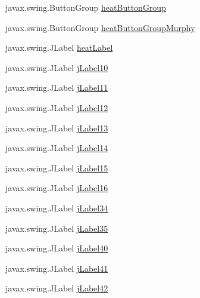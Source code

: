 \begin{DoxyCompactItemize}
\item 
javax.\+swing.\+Button\+Group \hyperlink{classTrainControllerComps_1_1TCTestConsole_a652801186a60bbfa55e7a7da6e356eac}{heat\+Button\+Group}
\item 
javax.\+swing.\+Button\+Group \hyperlink{classTrainControllerComps_1_1TCTestConsole_a1e24f88e3c130a9197c58398af71062b}{heat\+Button\+Group\+Murphy}
\item 
javax.\+swing.\+J\+Label \hyperlink{classTrainControllerComps_1_1TCTestConsole_ad009dbddef64d4cf00a17e75888599b1}{heat\+Label}
\item 
javax.\+swing.\+J\+Label \hyperlink{classTrainControllerComps_1_1TCTestConsole_afe6f59cd0dbb68f59d14d44937a20560}{j\+Label10}
\item 
javax.\+swing.\+J\+Label \hyperlink{classTrainControllerComps_1_1TCTestConsole_aedd451e4b3cb09d6204b76ad2300b40c}{j\+Label11}
\item 
javax.\+swing.\+J\+Label \hyperlink{classTrainControllerComps_1_1TCTestConsole_a007650252cf57b42e6de59a615d09728}{j\+Label12}
\item 
javax.\+swing.\+J\+Label \hyperlink{classTrainControllerComps_1_1TCTestConsole_a33d57c87dbe079fd23e3c74b00267c32}{j\+Label13}
\item 
javax.\+swing.\+J\+Label \hyperlink{classTrainControllerComps_1_1TCTestConsole_af255f1641c06bd410b59a7053693bae3}{j\+Label14}
\item 
javax.\+swing.\+J\+Label \hyperlink{classTrainControllerComps_1_1TCTestConsole_a15c9eee45ab19ef43c58bc649724616c}{j\+Label15}
\item 
javax.\+swing.\+J\+Label \hyperlink{classTrainControllerComps_1_1TCTestConsole_af9018c9d636ebc614bf81ede1c548656}{j\+Label16}
\item 
javax.\+swing.\+J\+Label \hyperlink{classTrainControllerComps_1_1TCTestConsole_a569a1a8efd99421bfbceab4312397ea1}{j\+Label34}
\item 
javax.\+swing.\+J\+Label \hyperlink{classTrainControllerComps_1_1TCTestConsole_a44eb572be1c20e76bce8193253e7c88f}{j\+Label35}
\item 
javax.\+swing.\+J\+Label \hyperlink{classTrainControllerComps_1_1TCTestConsole_a47b53ca5ad512b2b9ad8d1595bd9e0f5}{j\+Label40}
\item 
javax.\+swing.\+J\+Label \hyperlink{classTrainControllerComps_1_1TCTestConsole_ad200ed7938f299f879fa78afe898737f}{j\+Label41}
\item 
javax.\+swing.\+J\+Label \hyperlink{classTrainControllerComps_1_1TCTestConsole_a0c9860acba538f840d14c3c8196539a4}{j\+Label42}

\end{DoxyCompactItemize}
